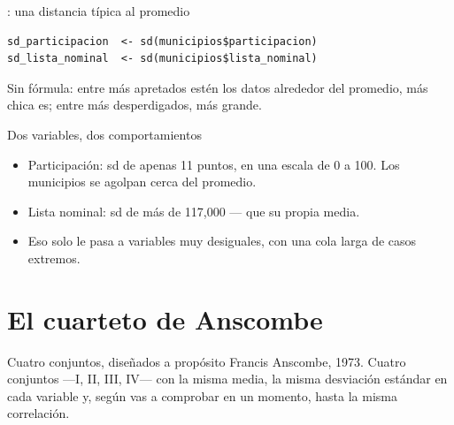 \begin{frame}[fragile]{: una distancia típica al promedio}
\begin{lstlisting}
sd_participacion  <- sd(municipios$participacion)
sd_lista_nominal  <- sd(municipios$lista_nominal)
\end{lstlisting}

  \vspace{0.5em}
  Sin fórmula: entre más apretados estén los datos alrededor del promedio,
  más chica es; entre más desperdigados, más grande.
\end{frame}

\begin{frame}{Dos variables, dos comportamientos}
  \vspace{0.3em}
  \begin{itemize}\setlength{\itemsep}{0.9em}
    \item<1-> Participación: \ac{sd} de apenas 11 puntos, en una escala de
          0 a 100. Los municipios se agolpan cerca del promedio.
    \item<2-> Lista nominal: \ac{sd} de más de 117,000 — que su
          propia media.
    \item<3-> Eso solo le pasa a variables muy desiguales, con una cola
          larga de casos extremos.
  \end{itemize}

  \vspace{1.0em}
\end{frame}

\section{El cuarteto de Anscombe}

\begin{frame}{Cuatro conjuntos, diseñados a propósito}
  \vspace{0.3em}
  Francis Anscombe, 1973. Cuatro conjuntos —I, II, III, IV— con la misma
  media, la misma desviación estándar en cada variable y, según vas a
  comprobar en un momento, hasta la misma correlación.

  \vspace{1.0em}
\end{frame}

